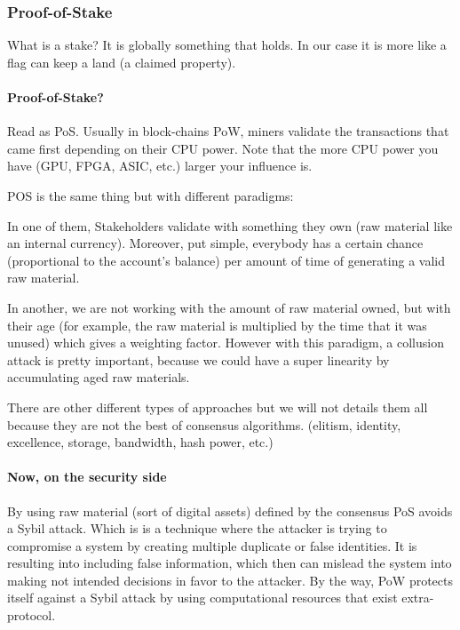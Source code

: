 \subsubsection{Proof-of-Stake}
What is a stake? It is globally something that holds. In our case it is more like a flag can keep a land (a claimed property).

\paragraph{Proof-of-Stake?\cite{King2012PPCoin:Proof-of-Stake}}
Read as PoS. Usually in block-chains PoW, miners validate the transactions that came first depending on their CPU power. Note that the more CPU power you have (GPU, FPGA, ASIC, etc.) larger your influence is.

POS is the same thing but with different paradigms:

In one of them, Stakeholders validate with something they own (raw material like an internal currency). Moreover, put simple, everybody has a certain chance (proportional to the account’s balance) per amount of time of generating a valid raw material.

In another, we are not working with the amount of raw material owned, but with their age (for example, the raw material is multiplied by the time that it was unused) which gives a weighting factor. However with this paradigm, a collusion attack is pretty important, because we could have a super linearity by accumulating aged raw materials.

There are other different types of approaches but we will not details them all because they are not the best of consensus algorithms. (elitism, identity, excellence, storage, bandwidth, hash power, etc.)

\paragraph{Now, on the security side} By using raw material (sort of digital assets) defined by the consensus PoS avoids a Sybil\cite{G.LawrencePaulSundararaj1D.R.AnitaSofiaLiz22014Anti-SybilNetworks} attack. Which is is a technique where the attacker is trying to compromise a system by creating multiple duplicate or false identities. It is resulting into including false information, which then can mislead the system into making not intended decisions in favor to the attacker. By the way, PoW protects itself against a Sybil attack by using computational resources that exist extra-protocol.

